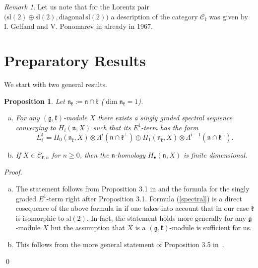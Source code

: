 \documentclass{tglat2e}
\newtheorem{prop}[theorem]{Proposition}
\theoremstyle{definition}
\theoremstyle{remark}
\newtheorem{remark}{Remark}
\newcommand{\kk}{\mathfrak{k}}
\newcommand{\nn}{\mathfrak{n}}
\renewcommand{\gg}{\mathfrak{g}}
\begin{document}
\begin{remark}
	Let us note that for the Lorentz pair $\big(\mathrm{sl}(2)\oplus\mathrm{sl}(2),\mathrm{diagonal}\,\mathrm{sl}(2)\big)$ a description of the category $\mathcal{C}_\kk$ was given by I. Gelfand and V. Ponomarev in \cite{GP} already in 1967.
\end{remark}

\section{Preparatory Results}
\label{sec:prelim}

We start with two general results.
	
\begin{prop}\label{prop:spec} Let $\nn_\kk:=\nn\cap\kk$ ($\dim\nn_\kk=1$).

\begin{enumerate}[a)]
	\item For any $(\gg,\kk)$-module $X$ there exists a
singly graded spectral sequence converging to $H_i(\nn,X)$ such that its $E^1$-term has the form 
\begin{equation}\label{spectral}
E_i^1=H_0(\nn_\kk,X)\otimes\Lambda^i(\nn\cap\kk^\perp)\oplus H_1(\nn_\kk,X)\otimes\Lambda^{i-1}(\nn\cap\kk^\perp).
\end{equation}
	\item If $X\in\mathcal{C}_{\kk,n}$ for $n\geq 0$, then the $\nn$-homology $H_\bullet(\nn,X)$ is finite dimensional.

\end{enumerate}
\end{prop}

\begin{proof}

\begin{enumerate}[a)]
\item	The statement follows from Proposition 3.1 in \cite{PZ5} and
  the formula for the singly graded $E^1$-term right after Proposition
  3.1. Formula (\ref {spectral}) is a direct cosequence of the above formula in
  \cite{PZ5} if one takes into account that in our case $\kk$ is
  isomorphic to $\mathrm{sl}(2)$.  In fact, the statement holds more generally for any $\gg$-module $X$ but the assumption that $X$ is a $(\gg,\kk)$-module is sufficient for us.  

\item This follows from the more general statement of Proposition 3.5 in~\cite{PZ5}.
\end{enumerate}
\qed\end{proof}
\end{document}
